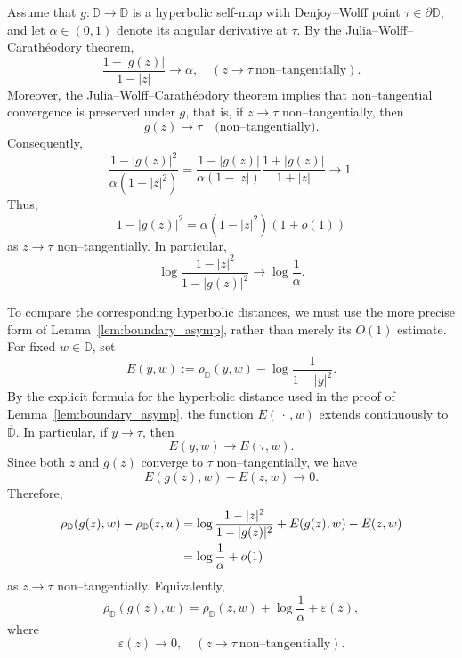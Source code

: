 \documentclass[12pt]{amsart}
\numberwithin{equation}{section}
\theoremstyle{plain}
\theoremstyle{definition}
\begin{document}
Assume that $g:\mathbb{D}\to\mathbb{D}$ is a hyperbolic self-map with
Denjoy--Wolff point $\tau\in\partial\mathbb{D}$, and let
$\alpha\in(0,1)$ denote its angular derivative at $\tau$. By the
Julia--Wolff--Carath\'eodory theorem,
\begin{equation*}
\label{eq:jwc_radial_ratio}
\frac{1-|g(z)|}{1-|z|}
\longrightarrow \alpha,
\quad
(z\to\tau\ \text{non--tangentially}).
\end{equation*}
Moreover, the Julia--Wolff--Carath\'eodory theorem implies that
non--tangential convergence is preserved under $g$, that is, if
$z\to\tau$ non--tangentially, then
\begin{equation*}
g(z)\to\tau
\quad\text{(non--tangentially)}.
\end{equation*}
Consequently,
\begin{equation*}
\frac{1-|g(z)|^2}{\alpha(1-|z|^2)}
=
\frac{1-|g(z)|}{\alpha(1-|z|)}
\frac{1+|g(z)|}{1+|z|}
\longrightarrow1.
\end{equation*}
Thus,
\begin{equation*}
\label{eq:boundary_ratio_squared}
1-|g(z)|^2
=
\alpha(1-|z|^2)(1+o(1))
\end{equation*}
as $z\to\tau$ non--tangentially. In particular,
\begin{equation*}
\label{eq:log_boundary_ratio}
\log\frac{1-|z|^2}{1-|g(z)|^2}
\longrightarrow
\log\frac{1}{\alpha}.
\end{equation*}

To compare the corresponding hyperbolic distances, we must use the
more precise form of Lemma~\ref{lem:boundary_asymp}, rather than merely
its $O(1)$ estimate. For fixed $w\in\mathbb{D}$, set
\begin{equation*}
E(y,w)
:=
\rho_{\mathbb{D}}(y,w)
-
\log\frac{1}{1-|y|^2}.
\end{equation*}
By the explicit formula for the hyperbolic distance used in the proof
of Lemma~\ref{lem:boundary_asymp}, the function
$E(\,\cdot\,,w)$ extends continuously to $\overline{\mathbb{D}}$.
In particular, if $y\to\tau$, then
\begin{equation*}
E(y,w)\longrightarrow E(\tau,w).
\end{equation*}
Since both $z$ and $g(z)$ converge to $\tau$ non--tangentially, we have
\begin{equation*}
E(g(z),w)-E(z,w)\longrightarrow0.
\end{equation*}
Therefore,
\begin{align*}
\rho_{\mathbb{D}}(g(z),w)-\rho_{\mathbb{D}}(z,w)
&=
\log\frac{1-|z|^2}{1-|g(z)|^2}
+
E(g(z),w)-E(z,w) \notag\\
&=
\log\frac{1}{\alpha}+o(1)
\label{eq:single_step_rate}
\end{align*}
as $z\to\tau$ non--tangentially. Equivalently,
\begin{equation}
\label{eq:single_step_rate_equiv}
\rho_{\mathbb{D}}(g(z),w)
=
\rho_{\mathbb{D}}(z,w)
+
\log\frac{1}{\alpha}
+
\varepsilon(z),
\end{equation}
where
\begin{equation*}
\varepsilon(z)\longrightarrow0,
\quad
(z\to\tau\ \text{non--tangentially}).
\end{equation*}
\end{document}
